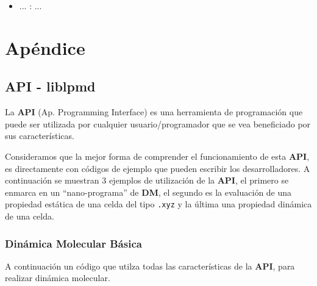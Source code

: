 \documentclass[a4paper,10pt]{scrbook}
\begin{document}
\begin{itemize}
 \item ... : ...
\end{itemize}

\chapter{Ap\'endice}

\section{API - liblpmd}
\label{ap:API}
La \textbf{API} (Ap. Programming Interface) es una herramienta de programaci\'on que puede ser utilizada por cualquier usuario/programador que se vea beneficiado por sus caracter\'isticas.

Consideramos que la mejor forma de comprender el funcionamiento de esta \textbf{API}, es directamente con c\'odigos de ejemplo que pueden escribir los desarrolladores. A continuaci\'on se muestran 3 ejemplos de utilizaci\'on de la \textbf{API}, el primero se enmarca en un ``nano-programa'' de \textbf{DM}, el segundo es la evaluaci\'on de una propiedad est\'atica de una celda del tipo \texttt{.xyz} y la \'ultima una propiedad din\'amica de una celda.

\subsection{Din\'amica Molecular B\'asica}

A continuaci\'on un c\'odigo que utilza todas las caracter\'isticas de la \textbf{API}, para realizar din\'amica molecular.
\end{document}
